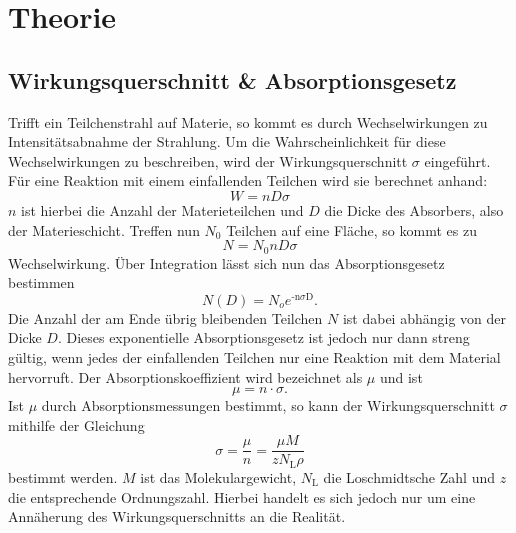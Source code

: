 \section{Theorie}
\label{sec:Theorie}
\subsection{Wirkungsquerschnitt \& Absorptionsgesetz}

Trifft ein Teilchenstrahl auf Materie, so kommt es durch Wechselwirkungen zu Intensitätsabnahme der Strahlung. Um die Wahrscheinlichkeit für diese Wechselwirkungen zu beschreiben, wird der Wirkungsquerschnitt $\sigma$ eingeführt. Für eine Reaktion mit einem einfallenden Teilchen wird sie berechnet anhand:
\begin{equation*}
\label{eq:Wahrscheinlichkeit}
	W = nD\sigma 
\end{equation*}
$n$ ist hierbei die Anzahl der Materieteilchen und $D$ die Dicke des Absorbers, also der Materieschicht. Treffen nun $N_0$ Teilchen auf eine Fläche, so kommt es zu 
\begin{equation*}
\label{eq:Wechselwirkungen}
	N = N_0nD\sigma
\end{equation*}
Wechselwirkung. Über Integration lässt sich nun das Absorptionsgesetz bestimmen
\begin{equation}
\label{eq:Absorptionsges}
	N(D) = N_o e^{\text{-n} \sigma \text{D}}  .
\end{equation}
Die Anzahl der am Ende übrig bleibenden Teilchen $N$ ist dabei abhängig von der Dicke $D$. Dieses exponentielle Absorptionsgesetz ist jedoch nur dann streng gültig, wenn jedes der einfallenden Teilchen nur eine Reaktion mit dem Material hervorruft.
Der Absorptionskoeffizient wird bezeichnet als $\mu$ und ist 
\begin{equation*}
	\mu = n\cdot\sigma.
\end{equation*}
Ist $\mu$ durch Absorptionsmessungen bestimmt, so kann der Wirkungsquerschnitt $\sigma$ mithilfe der Gleichung
\begin{equation}
	\sigma = \frac{\mu}{n} = \frac{\mu M}{zN_\text{L}\rho}
\end{equation}
bestimmt werden. $M$ ist das Molekulargewicht, $N_\text{L}$ die Loschmidtsche Zahl und $z$ die entsprechende Ordnungszahl. Hierbei handelt es sich jedoch nur um eine Annäherung des Wirkungsquerschnitts an die Realität.

